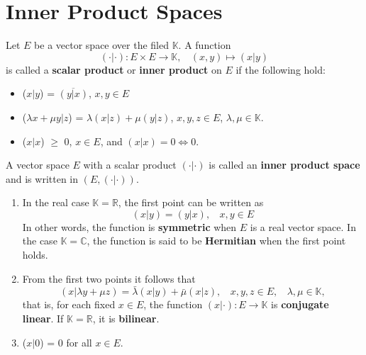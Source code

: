 \section{Inner Product Spaces}

\begin{definition}\label{def: inner_product}
    Let \(E\) be a vector space over the filed \(\mathbb{K}\). A function
    \[
        (\cdot | \cdot) \colon E \times E \to \mathbb{K}, \:\:\:\: (x, y) \mapsto (x|y)  
    \]
    is called a \textbf{scalar product} or \textbf{inner product} on \(E\) if the following
    hold:
    \begin{itemize} 
        \item (\(x|y\)) = \(\overline{\left(y|x\right)}\), \(x, y\in E\)
        \item (\(\lambda x + \mu y | z\)) = \(\lambda\left(x|z\right) + \mu\left(y|z\right)\), 
        \(x, y, z \in E\), \(\lambda, \mu \in \mathbb{K}\). 
        \item (\(x|x\)) \(\geq\) 0, \(x \in E\), and \(\left(x|x\right) = 0 \Leftrightarrow 0\). 
    \end{itemize}
    A vector space \(E\) with a scalar product \(\left(\cdot|\cdot\right)\) is called 
    an \textbf{inner product space} and is written in \(\left(E, \left(\cdot|\cdot\right)\right)\). 
\end{definition}

\begin{remark}
    \begin{enumerate}[label=(\alph*)]
        \item In the real case \(\mathbb{K} = \mathbb{R}\), the first point can be written as
        \[
            (x|y) = (y|x), \:\:\:\: x, y \in E  
        \]
        In other words, the function is \textbf{symmetric} when \(E\) is a real vector space.
        In the case \(\mathbb{K} = \mathbb{C}\), the function is said to be \textbf{Hermitian}
        when the first point holds. 
        \item From the first two points it follows that
        \[
            (x|\lambda y + \mu z) = \bar{\lambda}(x|y) + \bar{\mu}(x|z), \:\:\:\:
            x,y,z \in E, \:\:\:\: \lambda,\mu \in \mathbb{K},     
        \]
        that is, for each fixed \(x \in E\), the function \(\left(x|\cdot\right)\colon E \to \mathbb{K}\)
        is \textbf{conjugate linear}. If \(\mathbb{K} = \mathbb{R}\), it is \textbf{bilinear}. 

        \item (\(x|0\)) = 0 for all \(x \in E\). 
    \end{enumerate}

\end{remark}


